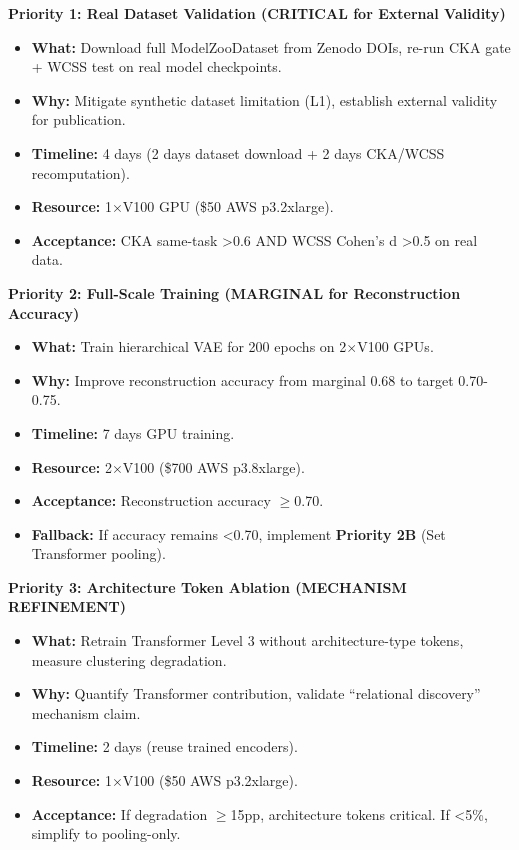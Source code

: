 \textbf{Priority 1: Real Dataset Validation (CRITICAL for External Validity)}

\begin{itemize}
\item \textbf{What:} Download full ModelZooDataset from Zenodo DOIs, re-run CKA gate + WCSS test on real model checkpoints.
\item \textbf{Why:} Mitigate synthetic dataset limitation (L1), establish external validity for publication.
\item \textbf{Timeline:} 4 days (2 days dataset download + 2 days CKA/WCSS recomputation).
\item \textbf{Resource:} 1$\times$V100 GPU (\$50 AWS p3.2xlarge).
\item \textbf{Acceptance:} CKA same-task >0.6 AND WCSS Cohen's d >0.5 on real data.
\end{itemize}

\textbf{Priority 2: Full-Scale Training (MARGINAL for Reconstruction Accuracy)}

\begin{itemize}
\item \textbf{What:} Train hierarchical VAE for 200 epochs on 2$\times$V100 GPUs.
\item \textbf{Why:} Improve reconstruction accuracy from marginal 0.68 to target 0.70-0.75.
\item \textbf{Timeline:} 7 days GPU training.
\item \textbf{Resource:} 2$\times$V100 (\$700 AWS p3.8xlarge).
\item \textbf{Acceptance:} Reconstruction accuracy $\geq$0.70.
\item \textbf{Fallback:} If accuracy remains <0.70, implement \textbf{Priority 2B} (Set Transformer pooling).
\end{itemize}

\textbf{Priority 3: Architecture Token Ablation (MECHANISM REFINEMENT)}

\begin{itemize}
\item \textbf{What:} Retrain Transformer Level 3 without architecture-type tokens, measure clustering degradation.
\item \textbf{Why:} Quantify Transformer contribution, validate ``relational discovery'' mechanism claim.
\item \textbf{Timeline:} 2 days (reuse trained encoders).
\item \textbf{Resource:} 1$\times$V100 (\$50 AWS p3.2xlarge).
\item \textbf{Acceptance:} If degradation $\geq$15pp, architecture tokens critical. If <5\%, simplify to pooling-only.
\end{itemize}


